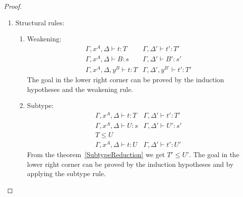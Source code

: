 \begin{theorem}
\begin{proof}
\begin{enumerate}
            \item Structural rules:
            \begin{enumerate}
                \item Weakening:
                $$
                \begin{array}{l|l}
                    \Gamma,x^A,\Delta \vdash t: T
                    &
                    \Gamma,\Delta' \vdash t' : T'
                    \\
                    \Gamma,x^A,\Delta \vdash B: s
                    &
                    \Gamma,\Delta' \vdash B' : s'
                    \\
                    \hline
                    \Gamma,x^A,\Delta,y^B \vdash t : T
                    &
                    \Gamma,\Delta',y^{B'} \vdash t' : T'
                \end{array}
                $$
                The goal in the lower right corner can be proved by the
                    induction hypotheses and the weakening rule.

                \item Subtype:
                $$
                \begin{array}{l|l}
                    \Gamma,x^A,\Delta \vdash t : T
                    &
                    \Gamma,\Delta' \vdash t' : T'
                    \\
                    \Gamma,x^A,\Delta \vdash U : s
                    &
                    \Gamma,\Delta' \vdash U' : s'
                    \\
                    T \le U
                    \\
                    \hline
                    \Gamma,x^A,\Delta \vdash t : U
                    &
                    \Gamma,\Delta' \vdash t' : U'
                \end{array}
                $$
                From the theorem~\ref{SubtypeReduction} we get $T' \le U'$. The
                    goal in the lower right corner can be proved by the
                    induction hypotheses and by applying the subtype rule.
            \end{enumerate}

        \end{enumerate}
    \end{proof}
\end{theorem}







